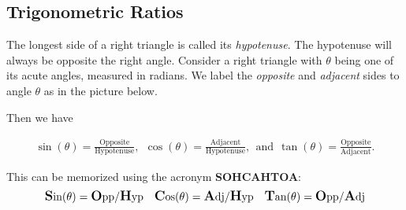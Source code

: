 \documentclass[letterpaper,12pt,oneside]{book}
\theoremstyle{definition}
\begin{document}
{\subsection*{Trigonometric Ratios}

The longest side of a right triangle is called its \emph{hypotenuse}.  The hypotenuse will always be opposite the right angle.  Consider a right triangle with $\theta$ being one of its acute angles, measured in radians.  We label the \emph{opposite} and \emph{adjacent} sides to angle $\theta$ as in the picture below.

\begin{center}
\end{center}

\noindent
Then we have

\begin{align*}
\sin(\theta)=\frac{\text{Opposite}}{\text{Hypotenuse}}, \ \ 
\cos(\theta)=\frac{\text{Adjacent}}{\text{Hypotenuse}}, \ \ \text{and} \ \ 
\tan(\theta)=\frac{\text{Opposite}}{\text{Adjacent}}.
\end{align*}

\noindent
This can be memorized using the acronym \textbf{SOHCAHTOA}:
\[
\mbox{\textbf{\large S}in}(\theta)=\mbox{\textbf{\large O}pp/\textbf{\large H}yp \ \ \textbf{\large C}os}(\theta)=\mbox{\textbf{\large A}dj/\textbf{\large H}yp \ \ \textbf{\large T}an}(\theta)=\mbox{\textbf{\large O}pp/\textbf{\large A}dj}
\]

}
\end{document}
